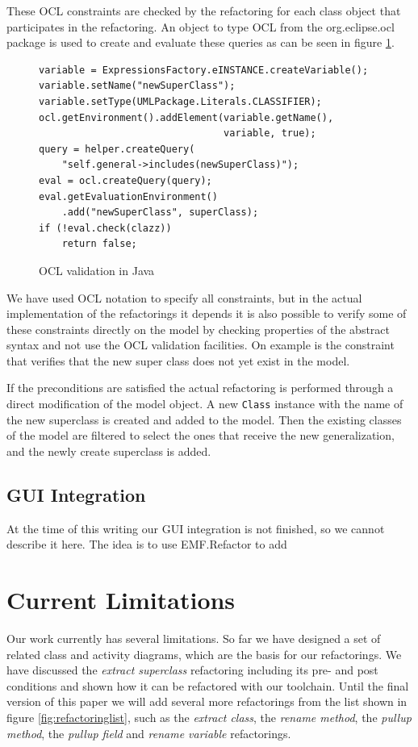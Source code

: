 \documentclass{llncs}
\begin{document}
These OCL constraints are checked by the refactoring for each class object that participates
in the refactoring. An object to type OCL from the org.eclipse.ocl package is used to create and evaluate these queries
as can be seen in figure \ref{lst:ocl}.

\begin{figure}
\begin{lstlisting}
variable = ExpressionsFactory.eINSTANCE.createVariable();
variable.setName("newSuperClass");
variable.setType(UMLPackage.Literals.CLASSIFIER);
ocl.getEnvironment().addElement(variable.getName(),
                                variable, true);
query = helper.createQuery(
    "self.general->includes(newSuperClass)");
eval = ocl.createQuery(query);
eval.getEvaluationEnvironment()
    .add("newSuperClass", superClass);
if (!eval.check(clazz))
    return false;
\end{lstlisting}
\caption{OCL validation in Java}
\label{lst:ocl}
\end{figure}

We have used OCL notation to specify all constraints, but in the actual implementation of the refactorings it depends it
is also possible to verify some of these constraints directly on the model by checking properties of the abstract syntax
and not use the OCL validation facilities. On example is the constraint that verifies that the new super class does not
yet exist in the model.

If the preconditions are satisfied the actual refactoring is performed through a direct modification of the model object.
A new \lstinline|Class| instance with the name of the new superclass is created and added to the model. Then the existing
classes of the model are filtered to select the ones that receive the new generalization, and the newly create superclass
is added.




\subsection{GUI Integration}
At the time of this writing our GUI integration is not finished, so we cannot describe it here. The idea is to use EMF.Refactor to add 

\section{Current Limitations}
Our work currently has several limitations. So far we have designed a set of related class and activity diagrams,
which are the basis for our refactorings. We have discussed the \textit{extract superclass} refactoring including its
pre- and post conditions and shown how it can be refactored with our toolchain. Until the final version of this
paper we will add several more refactorings from the list shown in figure \ref{fig:refactoringlist}, such as the
\textit{extract class}, the \textit{rename method}, the \textit{pullup method}, the \textit{pullup field} and 
\textit{rename variable} refactorings.
\end{document}
